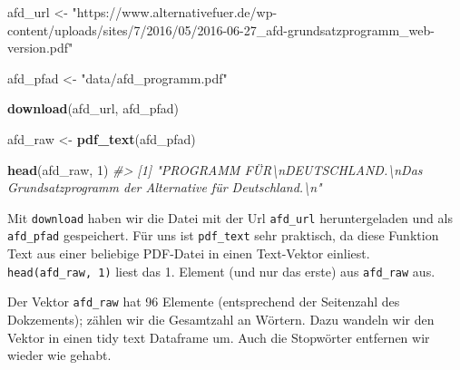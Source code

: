 \documentclass[12pt,ngerman,]{book}
\makeatletter
\newenvironment{Shaded}{\begin{snugshade}}{\end{snugshade}}
\newcommand{\KeywordTok}[1]{\textcolor[rgb]{0.13,0.29,0.53}{\textbf{{#1}}}}
\newcommand{\DataTypeTok}[1]{\textcolor[rgb]{0.13,0.29,0.53}{{#1}}}
\newcommand{\DecValTok}[1]{\textcolor[rgb]{0.00,0.00,0.81}{{#1}}}
\newcommand{\StringTok}[1]{\textcolor[rgb]{0.31,0.60,0.02}{{#1}}}
\newcommand{\CommentTok}[1]{\textcolor[rgb]{0.56,0.35,0.01}{\textit{{#1}}}}
\newcommand{\NormalTok}[1]{{#1}}
\newenvironment{kframe}{%
\medskip{}
\setlength{\fboxsep}{.8em}
 \def\at@end@of@kframe{}%
 \ifinner\ifhmode%
  \def\at@end@of@kframe{\end{minipage}}%
  \begin{minipage}{\columnwidth}%
 \fi\fi%
 \def\FrameCommand##1{\hskip\@totalleftmargin \hskip-\fboxsep
 \colorbox{shadecolor}{##1}\hskip-\fboxsep
     \hskip-\linewidth \hskip-\@totalleftmargin \hskip\columnwidth}%
 \MakeFramed {\advance\hsize-\width
   \@totalleftmargin\z@ \linewidth\hsize
   \@setminipage}}%
 {\par\unskip\endMakeFramed%
 \at@end@of@kframe}
\renewenvironment{Shaded}{\begin{kframe}}{\end{kframe}}
\makeatother
\begin{document}
\begin{Shaded}
\begin{Highlighting}[]
\NormalTok{afd_url <-}\StringTok{ "https://www.alternativefuer.de/wp-content/uploads/sites/7/2016/05/2016-06-27_afd-grundsatzprogramm_web-version.pdf"}

\NormalTok{afd_pfad <-}\StringTok{ "data/afd_programm.pdf"}

\KeywordTok{download}\NormalTok{(afd_url, afd_pfad)}

\NormalTok{afd_raw <-}\StringTok{ }\KeywordTok{pdf_text}\NormalTok{(afd_pfad)}

\KeywordTok{head}\NormalTok{(afd_raw, }\DecValTok{1}\NormalTok{)}
\CommentTok{#> [1] "PROGRAMM FÜR\textbackslash{}nDEUTSCHLAND.\textbackslash{}nDas Grundsatzprogramm der Alternative für Deutschland.\textbackslash{}n"}
\end{Highlighting}
\end{Shaded}

Mit \texttt{download} haben wir die Datei mit der Url \texttt{afd\_url}
heruntergeladen und als \texttt{afd\_pfad} gespeichert. Für uns ist
\texttt{pdf\_text} sehr praktisch, da diese Funktion Text aus einer
beliebige PDF-Datei in einen Text-Vektor einliest.
\texttt{head(afd\_raw,\ 1)} liest das 1. Element (und nur das erste) aus
\texttt{afd\_raw} aus.

Der Vektor \texttt{afd\_raw} hat 96 Elemente (entsprechend der
Seitenzahl des Dokzements); zählen wir die Gesamtzahl an Wörtern. Dazu
wandeln wir den Vektor in einen tidy text Dataframe um. Auch die
Stopwörter entfernen wir wieder wie gehabt.

\begin{Shaded}
\end{Shaded}
\end{document}

